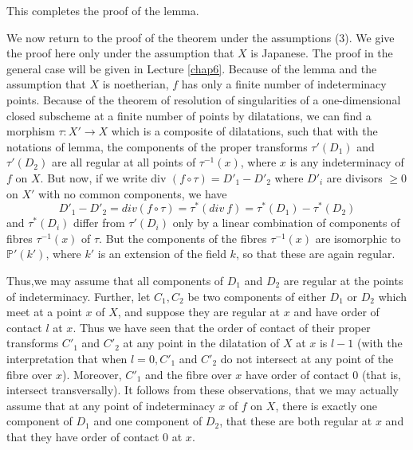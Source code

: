 This completes the proof of the lemma.

We now return to the proof of the theorem under the assumptions
(3). We give the proof here only under the assumption that $X$ is
Japanese. The proof in the general case will be given in Lecture
\ref{chap6}. Because of the lemma and the assumption that $X$ is noetherian,
$f$ has only a finite number of indeterminacy points. Because of the
theorem of resolution of singularities of a one-dimensional closed
subscheme at a finite number of points by dilatations, we can find a
morphism $\tau : X' \to X$ which is a composite of dilatations, such
that with the notations of lemma, the components of the proper
transforms $\tau' (D_{1})$ and $\tau' (D_{2})$ are all regular at all
points of $\tau^{-1} (x)$, where $x$ is any indeterminacy of $f$ on
$X$. But now, if we write div $(f \circ \tau) = D'_{1} - D'_{2}$ where
$D'_{i}$ are divisors $\ge 0$ on $X'$ with no common components, we
have   
$$
D'_{1} - D'_{2} = div ( f \circ \tau) = \tau^{*} (div ~ f) = \tau^{*}
(D_{1}) - \tau^{*}(D_{2}) 
$$    
and $\tau^{*}(D_{i})$ differ from $\tau'(D_{i})$ only by a linear
combination of components of fibres $\tau^{-1}(x)$ of $\tau$. But the
components of the fibres $\tau^{-1}(x)$ are isomorphic to
$\mathbb{P'}(k')$, where $k'$ is an extension of the field $k$, so
that these are again regular. 

Thus,\pageoriginale we may assume that all components of $D_{1}$ and $D_{2}$ are
regular at the points of indeterminacy. Further, let $C_{1}, C_{2}$ be
two components of either $D_{1}$ or $D_{2}$ which meet at a point $x$
of $X$, and suppose they are regular at $x$ and have order of contact
$l$ at $x$. Thus we have seen that the order of contact of their
proper transforms $C'_{1}$ and $C'_{2}$ at any point in the dilatation
of $X$ at $x$ is $l-1$ (with the interpretation that when $l = 0,
C'_{1}$ and $C'_{2}$ do not intersect at any point of the fibre over
$x$). Moreover, $C'_{1}$ and the fibre over $x$ have order of contact
0 (that is, intersect transversally). It follows from these
observations, that we may actually assume that at any point of
indeterminacy $x$ of $f$ on $X$, there is exactly one component of
$D_{1}$ and one component of $D_{2}$, that these are both regular at
$x$ and that they have order of contact $0$ at $x$.  

